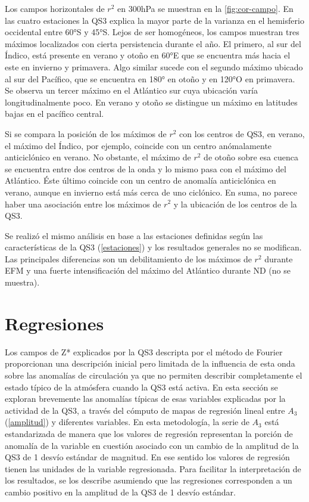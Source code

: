 \documentclass[spanish,a4paper,12pt,oneside]{book}
\begin{document}
Los campos horizontales de \(r^2\) en 300hPa se muestran en la
\autoref{fig:cor-campo}. En las cuatro estaciones la QS3 explica la
mayor parte de la varianza en el hemisferio occidental entre 60°S y
45°S. Lejos de ser homogéneos, los campos muestran tres máximos
localizados con cierta persistencia durante el año. El primero, al sur
del Índico, está presente en verano y otoño en 60°E que se encuentra más
hacia el este en invierno y primavera. Algo similar sucede con el
segundo máximo ubicado al sur del Pacífico, que se encuentra en 180° en
otoño y en 120°O en primavera. Se observa un tercer máximo en el
Atlántico sur cuya ubicación varía longitudinalmente poco. En verano y
otoño se distingue un máximo en latitudes bajas en el pacífico central.

Si se compara la posición de los máximos de \(r^2\) con los centros de
QS3, en verano, el máximo del Índico, por ejemplo, coincide con un
centro anómalamente anticiclónico en verano. No obstante, el máximo de
\(r^2\) de otoño sobre esa cuenca se encuentra entre dos centros de la
onda y lo mismo pasa con el máximo del Atlántico. Éste último coincide
con un centro de anomalía anticiclónica en verano, aunque en invierno
está más cerca de uno ciclónico. En suma, no parece haber una asociación
entre los máximos de \(r^2\) y la ubicación de los centros de la QS3.

Se realizó el mismo análisis en base a las estaciones definidas según
las características de la QS3 (\autoref{estaciones}) y los resultados
generales no se modifican. Las principales diferencias son un
debilitamiento de los máximos de \(r^2\) durante EFM y una fuerte
intensificación del máximo del Atlántico durante ND (no se muestra).

\hypertarget{regresiones}{%
\section{Regresiones}\label{regresiones}}

Los campos de Z* explicados por la QS3 descripta por el método de
Fourier proporcionan una descripción inicial pero limitada de la
influencia de esta onda sobre las anomalías de circulación ya que no
permiten describir completamente el estado típico de la atmósfera cuando
la QS3 está activa. En esta sección se exploran brevemente las anomalías
típicas de esas variables explicadas por la actividad de la QS3, a
través del cómputo de mapas de regresión lineal entre \(A_3\)
(\autoref{amplitud}) y diferentes variables. En esta metodología, la
serie de \(A_3\) está estandarizada de manera que los valores de
regresión representan la porción de anomalía de la variable en cuestión
asociado con un cambio de la amplitud de la QS3 de 1 desvío estándar de
magnitud. En ese sentido los valores de regresión tienen las unidades de
la variable regresionada. Para facilitar la interpretación de los
resultados, se los describe asumiendo que las regresiones corresponden a
un cambio positivo en la amplitud de la QS3 de 1 desvío estándar.
\end{document}
